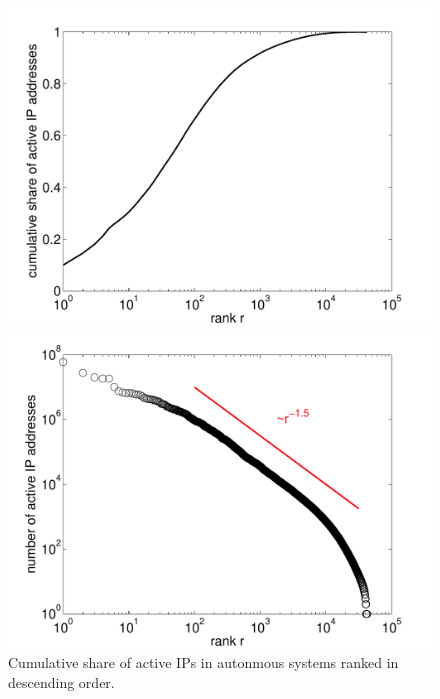 %

\begin{figure}[bt]
\begin{minipage}[b]{0.49\textwidth}
  \centering
  \includegraphics[width=1\textwidth]{aslevel/census/figs/shareactiveIPs}
  \caption{Cumulative share of active IPs in autonmous systems ranked in descending order.}
  \label{fig:shareactiveIPs}
\end{minipage}
\hspace{0.01\textwidth}
\begin{minipage}[b]{0.49\textwidth}
  \centering
  \includegraphics[width=\textwidth]{aslevel/census/figs/activeIPs}

\end{minipage}
\end{figure}
